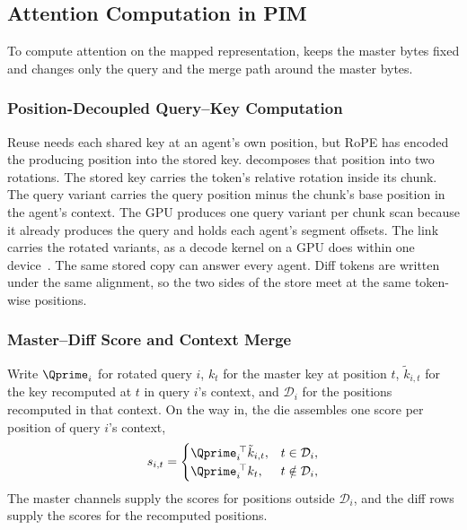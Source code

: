 \subsection{Attention Computation in PIM}
\label{sec:attention-pim}

To compute attention on the mapped representation, \Fugue{}
keeps the master bytes fixed and changes only the query and
the merge path around the master bytes.


\subsubsection{Position-Decoupled Query--Key Computation}
\label{sec:c1}
\label{sec:c1-inv}
\label{sec:c1-where}

Reuse needs each shared key at an agent's own position, but
RoPE has encoded the producing position into the stored
key.
\Fugue{} decomposes that position into two rotations.
The stored key carries the token's relative rotation inside
its chunk.
The query variant carries the query position minus the
chunk's base position in the agent's context.
The GPU produces one query variant per chunk scan because it
already produces the query and holds each agent's segment
offsets.
The link carries the rotated variants, as a decode kernel on
a GPU does within one device~\cite{lazyattn}.
The same stored copy can answer every agent.
Diff tokens are written under the same alignment, so the two
sides of the store meet at the same token-wise positions.

\subsubsection{Master--Diff Score and Context Merge}
\label{sec:diemerge}

Write $\Qprime_i$ for rotated query $i$, $k_t$ for the
master key at position $t$, $\tilde{k}_{i,t}$ for the key
recomputed at $t$ in query $i$'s context, and
$\mathcal{D}_i$ for the positions recomputed in that
context.
On the way in, the die assembles one score per position of
query $i$'s context,
\begin{equation}
s_{i,t}=
\begin{cases}
\Qprime_i{}^{\!\top}\tilde{k}_{i,t}, & t\in\mathcal{D}_i,\\
\Qprime_i{}^{\!\top}k_t, & t\notin\mathcal{D}_i,
\end{cases}
\label{eq:step2}
\end{equation}
The master channels supply the scores for positions outside
$\mathcal{D}_i$, and the diff rows supply the scores for
the recomputed positions.

